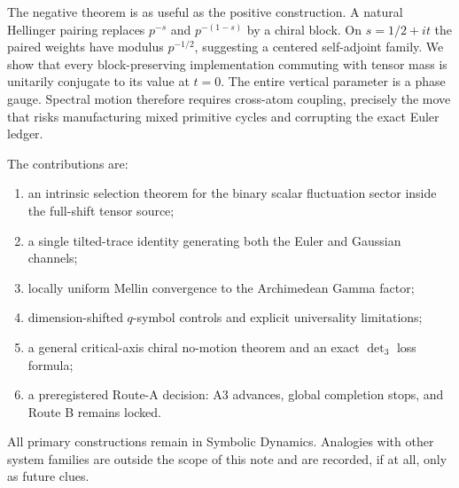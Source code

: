 The negative theorem is as useful as the positive construction. A natural
Hellinger pairing replaces $p^{-s}$ and $p^{-(1-s)}$ by a chiral block. On
$s=1/2+it$ the paired weights have modulus $p^{-1/2}$, suggesting a centered
self-adjoint family. We show that every block-preserving implementation
commuting with tensor mass is unitarily conjugate to its value at $t=0$.
The entire vertical parameter is a phase gauge. Spectral motion therefore
requires cross-atom coupling, precisely the move that risks manufacturing
mixed primitive cycles and corrupting the exact Euler ledger.

The contributions are:
\begin{enumerate}
  \item an intrinsic selection theorem for the binary scalar fluctuation
        sector inside the full-shift tensor source;
  \item a single tilted-trace identity generating both the Euler and Gaussian
        channels;
  \item locally uniform Mellin convergence to the Archimedean Gamma factor;
  \item dimension-shifted $q$-symbol controls and explicit universality
        limitations;
  \item a general critical-axis chiral no-motion theorem and an exact
        $\det_3$ loss formula;
  \item a preregistered Route-A decision: A3 advances, global completion
        stops, and Route B remains locked.
\end{enumerate}

All primary constructions remain in Symbolic Dynamics. Analogies with other
system families are outside the scope of this note and are recorded, if at
all, only as future clues.

